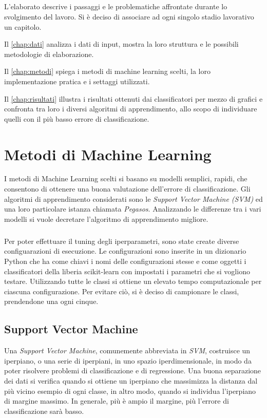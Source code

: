 \paragraph*{}
L'elaborato descrive i passaggi e le problematiche affrontate durante lo svolgimento del lavoro. Si è deciso di associare ad ogni singolo stadio lavorativo un capitolo. 

Il \autoref{chap:dati} analizza i dati di input, mostra la loro struttura e le possibili metodologie di elaborazione. 

Il \autoref{chap:metodi} spiega i metodi di machine learning scelti, la loro implementazione pratica e i settaggi utilizzati.

Il \autoref{chap:risultati} illustra i risultati ottenuti dai classificatori per mezzo di grafici e confronta tra loro i diversi algoritmi di apprendimento, allo scopo di individuare quelli con il più basso errore di classificazione.



\chapter{Metodi di Machine Learning} 
\label{chap:metodi}

I metodi di Machine Learning scelti si basano su modelli semplici, rapidi, che consentono di ottenere una buona valutazione dell'errore di classificazione. Gli algoritmi di apprendimento considerati sono le \textit{Support Vector Machine (SVM)} ed una loro particolare istanza chiamata \textit{Pegasos}. Analizzando le differenze tra i vari modelli si vuole decretare l'algoritmo di apprendimento migliore.

\paragraph*{}
Per poter effettuare il tuning degli iperparametri, sono state create diverse configuarazioni di esecuzione.
Le configurazioni sono inserite in un dizionario Python che ha come chiavi i nomi delle configurazioni stesse e come oggetti i classificatori della liberia scikit-learn con impostati i parametri che si vogliono testare.
Utilizzando tutte le classi si ottiene un elevato tempo computazionale per ciascuna configurazione. Per evitare ciò, si è deciso di campionare le classi, prendendone una ogni cinque.

\section{Support Vector Machine}
Una \textit{Support Vector Machine}, comunemente abbreviata in \textit{SVM}, costruisce un iperpiano, o una serie di iperpiani, in uno spazio iperdimensionale, in modo da poter risolvere problemi di classificazione e di regressione. Una buona separazione dei dati si verifica quando si ottiene un iperpiano che massimizza la distanza dal più vicino esempio di ogni classe, in altro modo, quando si individua l'iperpiano di margine massimo. In generale, più è ampio il margine, più l'errore di classificazione sarà basso.

